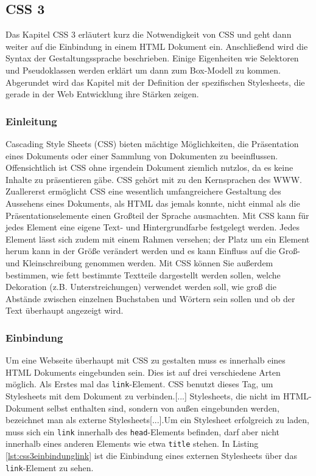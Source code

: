 \subsection{CSS 3}
Das Kapitel CSS 3 erläutert kurz die Notwendigkeit von CSS und geht dann weiter auf die Einbindung in einem HTML Dokument ein. Anschließend wird die Syntax der Gestaltungssprache beschrieben. Einige Eigenheiten wie Selektoren und Pseudoklassen werden erklärt um dann zum Box-Modell zu kommen. Abgerundet wird das Kapitel mit der Definition der spezifischen Stylesheets, die gerade in der Web Entwicklung ihre Stärken zeigen.

\subsubsection{Einleitung}
\glqq Cascading Style Sheets (CSS) bieten mächtige Möglichkeiten, die Präsentation eines Dokuments oder einer Sammlung von Dokumenten zu beeinflussen. Offensichtlich ist CSS ohne irgendein Dokument ziemlich nutzlos, da es keine Inhalte zu präsentieren gäbe.\grqq{}\cite[S.1]{MeyeCasc2005} CSS gehört mit zu den Kernsprachen des WWW. \glqq Zuallererst ermöglicht CSS eine wesentlich umfangreichere Gestaltung des Aussehens eines Dokuments, als HTML das jemals konnte, nicht einmal als die Präsentationselemente einen Großteil der Sprache ausmachten. Mit CSS kann für jedes Element eine eigene Text- und Hintergrundfarbe festgelegt werden. Jedes Element lässt sich zudem mit einem Rahmen versehen; der Platz um ein Element herum kann in der Größe verändert werden und es kann Einfluss auf die Groß- und Kleinschreibung genommen werden. Mit CSS können Sie außerdem  bestimmen, wie fett bestimmte Textteile dargestellt werden sollen, welche Dekoration (z.B. Unterstreichungen) verwendet werden soll, wie groß die Abstände zwischen einzelnen Buchstaben und Wörtern sein sollen und ob der Text überhaupt angezeigt wird.\grqq{}\cite[S.4]{MeyeCasc2005}

\subsubsection{Einbindung} Um eine Webseite überhaupt mit CSS zu gestalten muss es innerhalb eines HTML Dokuments eingebunden sein. Dies ist auf drei verschiedene Arten möglich. Als Erstes mal das \texttt{link}-Element. \glqq CSS benutzt dieses Tag, um Stylesheets mit dem Dokument zu verbinden.[...] Stylesheets, die nicht im HTML-Dokument selbst enthalten sind, sondern von außen eingebunden werden, bezeichnet man als externe Stylesheets[...].Um ein Stylesheet erfolgreich zu laden, muss sich ein \texttt{link} innerhalb des \texttt{head}-Elements befinden, darf aber nicht innerhalb eines anderen Elements wie etwa \texttt{title} stehen.\grqq{}\cite[S.14]{MeyeCasc2005} In Listing \ref{lst:css3einbindunglink} ist die Einbindung eines externen Stylesheets über das \texttt{link}-Element zu sehen.
	
